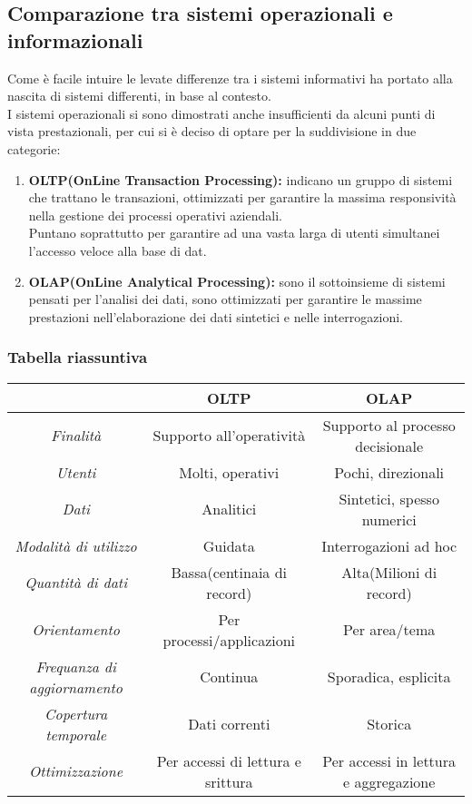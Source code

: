 \documentclass[../main.tex]{subfiles}
\begin{document}
	\subsection{Comparazione tra sistemi operazionali e informazionali}
	Come è facile intuire le levate differenze tra i sistemi informativi ha portato alla nascita di sistemi differenti, in base al contesto.\\
	I sistemi operazionali si sono dimostrati anche insufficienti da alcuni punti di vista prestazionali, per cui si è deciso di optare per la suddivisione in due categorie:
	\begin{enumerate}
		\item \textbf{OLTP(OnLine Transaction Processing):} indicano un gruppo di sistemi che trattano le transazioni, ottimizzati per garantire la massima responsività nella gestione dei processi operativi aziendali.\\
			Puntano soprattutto per garantire ad una vasta larga di utenti simultanei l'accesso veloce alla base di dat.
		\item \textbf{OLAP(OnLine Analytical Processing):} sono il sottoinsieme di sistemi pensati per l'analisi dei dati, sono ottimizzati per garantire le massime prestazioni nell'elaborazione dei dati sintetici e nelle interrogazioni.
	\end{enumerate}

	\subsubsection{Tabella riassuntiva}

	\begin{center}
		\begin{tabular}{|c|c|c|}
			\hline
			& \textbf{OLTP} & \textbf{OLAP}\\
			\hline
			\textit{Finalità} & Supporto all'operatività & Supporto al processo decisionale\\
			\hline
			\textit{Utenti} & Molti, operativi & Pochi, direzionali\\
			\hline
			\textit{Dati} & Analitici & Sintetici, spesso numerici\\
			\hline
			\textit{Modalità di utilizzo} & Guidata & Interrogazioni ad hoc\\
			\hline
			\textit{Quantità di dati} & Bassa(centinaia di record) & Alta(Milioni di record)\\
			\hline
			\textit{Orientamento} & Per processi/applicazioni & Per area/tema\\
			\hline
			\textit{Frequanza di aggiornamento} & Continua & Sporadica, esplicita\\
			\hline
			\textit{Copertura temporale} & Dati correnti & Storica\\
			\hline
			\textit{Ottimizzazione} & Per accessi di lettura e srittura & Per accessi in lettura e aggregazione\\
			\hline
		\end{tabular}
	\end{center}
\end{document}
